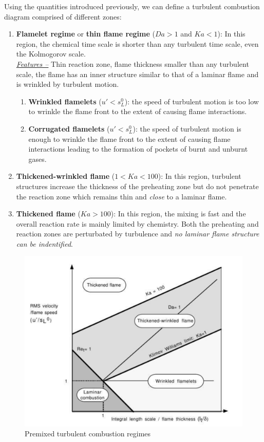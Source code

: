\documentclass[a4paper,11pt]{article}
\begin{document}
Using the quantities introduced previously, we can define a turbulent combustion diagram comprised of different zones:
\begin{enumerate}
	\item \textbf{Flamelet regime} or \textbf{thin flame regime} ($Da>1$ and $Ka<1$): In this region, the chemical time scale is shorter than any turbulent time scale, even the Kolmogorov scale.\\
	\underline{\textit{Features --}} Thin reaction zone, flame thickness smaller than any turbulent scale, the flame has an inner structure similar to that of a laminar flame and is wrinkled by turbulent motion.
	\begin{enumerate}
		\item \textbf{Wrinkled flamelets} ($u'<s^0_L$): the speed of turbulent motion is too low to wrinkle the flame front to the extent of causing flame interactions. 
		\item \textbf{Corrugated flamelets} ($u'<s^0_L$): the speed of turbulent motion is enough to wrinkle the flame front to the extent of causing flame interactions leading to the formation of pockets of burnt and unburnt gases.
	\end{enumerate}
	\item \textbf{Thickened-wrinkled flame} ($1<Ka<100$): In this region, turbulent structures increase the thickness of the preheating zone but do not penetrate the reaction zone which remains thin and \emph{close} to a laminar flame.
	\item \textbf{Thickened flame} ($Ka>100$): In this region, the mixing is fast and the overall reaction rate is mainly limited by chemistry. Both the preheating and reaction zones are perturbated by turbulence and \emph{no laminar flame structure can be indentified}.
\end{enumerate}
\begin{figure}[h!]
	\centering
	\includegraphics[width=.8\linewidth]{figures/diagram.png}
	\caption{Premixed turbulent combustion regimes}
\end{figure}
\end{document}
